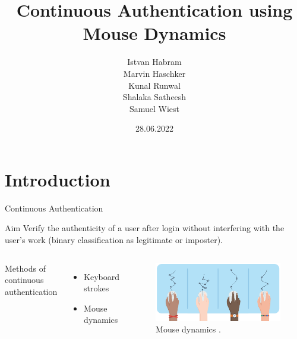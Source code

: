 \documentclass{beamer}
\title{Continuous Authentication using Mouse Dynamics}
\author{
Istvan Habram \\
Marvin Haschker\\
Kunal Runwal \\
Shalaka Satheesh \\
Samuel Wiest \\
}
\institute[HBRS]{Hochschule Bonn-Rhein-Sieg}
\date{28.06.2022}
\begin{document}
{
\begin{frame}
\titlepage
\end{frame}
}


\section{Introduction}
\begin{frame}{Continuous Authentication}
    \begin{block}{Aim}
    Verify the authenticity of a user after login without interfering with the user's work (binary classification as legitimate or imposter). 
    \end{block}
    \begin{columns}[onlytextwidth]
    Methods of continuous authentication
    \begin{itemize}
        \item Keyboard strokes
        \item Mouse dynamics
    \end{itemize}
    \begin{figure}
        \centering
        \includegraphics[width=\textwidth]{theme/images/mouse dynamics.png}
        \caption{Mouse dynamics \cite{tommy_riggs}.}
        \label{fig:mouse_dynamics}
    \end{figure}
    \end{columns}
\end{frame}
\end{document}
